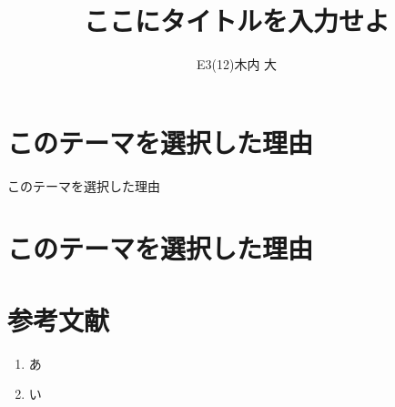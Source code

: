 \documentclass[fleqn,dvipdfmx,twocolumn]{jsarticle}
\title{ここにタイトルを入力せよ}
\author{
  E3(12)木内 大
}
\date{}
\begin{document}
\maketitle
\section{このテーマを選択した理由}
このテーマを選択した理由
\section{このテーマを選択した理由}
\section*{参考文献}
\begin{enumerate}
    \item あ
    \item い
\end{enumerate}
\end{document}
